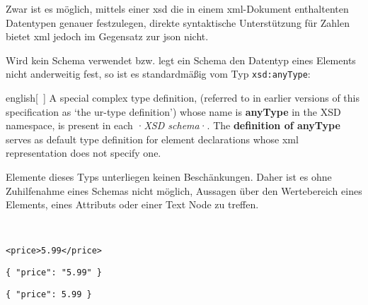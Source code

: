 Zwar ist es möglich, mittels einer \acrfull{xsd} die in einem \acrshort{xml}-Dokument enthaltenten Datentypen genauer festzulegen, direkte syntaktische Unterstützung für Zahlen bietet \acrshort{xml} jedoch im Gegensatz zur \acrlong{json} nicht.

Wird kein Schema verwendet bzw. legt ein Schema den Datentyp eines Elements nicht anderweitig fest, so ist es standardmäßig vom Typ \texttt{xsd:anyType}:

\begin{foreigndisplayquote}{english}[{~\cite[Abschnitt 2.2.1.1]{xmlschema11-1}}]
    A special complex type definition, (referred to in earlier versions of this specification as `the ur-type definition') whose name is \textbf{anyType} in the XSD namespace, is present in each ·\emph{XSD schema}·. The \textbf{definition of anyType} serves as default type definition for element declarations whose \acrshort{xml} representation does not specify one.
\end{foreigndisplayquote}

Elemente dieses Typs unterliegen keinen Beschänkungen. Daher ist es ohne Zuhilfenahme eines Schemas nicht möglich, Aussagen über den Wertebereich eines Elements, eines Attributs oder einer Text Node zu treffen.

\begin{example}~

    \begin{verbatim}
<price>5.99</price>
    \end{verbatim}
    \label{fig:typeinferxml}

    \begin{verbatim}
{ "price": "5.99" }
    \end{verbatim}
    \label{fig:typeinferjson1}

    \begin{verbatim}
{ "price": 5.99 }
    \end{verbatim}
    \label{fig:typeinferjson2}

\end{example}


